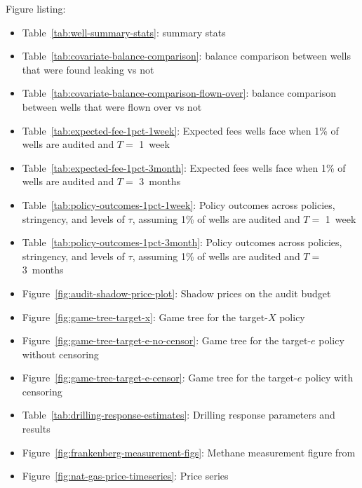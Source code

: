\documentclass[12pt,oneside,letterpaper]{article}
\begin{document}
\label{sec:price-data}


Figure listing:
\begin{itemize}
\item Table~\ref{tab:well-summary-stats}: summary stats
\item Table~\ref{tab:covariate-balance-comparison}: balance comparison between wells that were found leaking vs not
\item Table~\ref{tab:covariate-balance-comparison-flown-over}: balance comparison between wells that were flown over vs not
\item Table~\ref{tab:expected-fee-1pct-1week}: Expected fees wells face when 1\% of wells are audited and \(T = \) 1~week
\item Table~\ref{tab:expected-fee-1pct-3month}: Expected fees wells face when 1\% of wells are audited and \(T = \) 3~months
\item Table~\ref{tab:policy-outcomes-1pct-1week}: Policy outcomes across policies, stringency, and levels of \(\tau\), assuming 1\% of wells are audited and \(T = \) 1~week
\item Table~\ref{tab:policy-outcomes-1pct-3month}: Policy outcomes across policies, stringency, and levels of \(\tau\), assuming 1\% of wells are audited and \(T = \) 3~months
\item Figure~\ref{fig:audit-shadow-price-plot}: Shadow prices on the audit budget
\item Figure~\ref{fig:game-tree-target-x}: Game tree for the target-\(X\) policy
\item Figure~\ref{fig:game-tree-target-e-no-censor}: Game tree for the target-\(e\) policy without censoring
\item Figure~\ref{fig:game-tree-target-e-censor}: Game tree for the target-\(e\) policy with censoring
\item Table~\ref{tab:drilling-response-estimates}: Drilling response parameters and results
\item Figure~\ref{fig:frankenberg-measurement-figs}: Methane measurement figure from \textcite{Frankenberg/etal:2016}
\item Figure~\ref{fig:nat-gas-price-timeseries}: Price series

\end{itemize}
\end{document}
